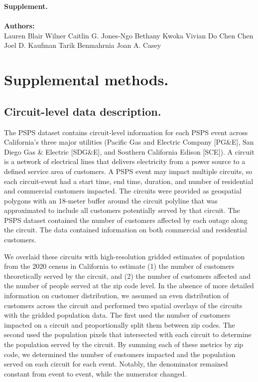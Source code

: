 \documentclass[../main.tex]{subfiles}
\begin{document}
% 

\textbf{Supplement.}
\\
\\
\textbf{Authors:}
\\
Lauren Blair Wilner
Caitlin G. Jones-Ngo
Bethany Kwoka
Vivian Do
Chen Chen
Joel D. Kaufman
Tarik Benmahrnia
Joan A. Casey

\pagebreak
\section{Supplemental methods.}
\subsection{Circuit-level data description.}
The PSPS dataset contains circuit-level information for each PSPS event across California's three major utilities (Pacific Gas and Electric Company [PG\&E], San Diego Gas \& Electric [SDG\&E], and Southern California Edison [SCE]). A circuit is a network of electrical lines that delivers electricity from a power source to a defined service area of customers. A PSPS event may impact multiple circuits, so each circuit-event had a start time, end time, duration, and number of residential and commercial customers impacted. The circuits were provided as geospatial polygons with an 18-meter buffer around the circuit polyline that was approximated to include all customers potentially served by that circuit. The PSPS dataset contained the number of customers affected by each outage along the circuit. The data contained information on both commercial and residential customers. 

We overlaid these circuits with high-resolution gridded estimates of population from the 2020 census in California to estimate (1) the number of customers theoretically served by the circuit, and (2) the number of customers affected and the number of people served at the zip code level. In the absence of more detailed information on customer distribution, we assumed an even distribution of customers across the circuit and performed two spatial overlays of the circuits with the gridded population data. The first used the number of customers impacted on a circuit and proportionally split them between zip codes. The second used the population pixels that intersected with each circuit to determine the population served by the circuit. By summing each of these metrics by zip code, we determined the number of customers impacted and the population served on each circuit for each event. Notably, the denominator remained constant from event to event, while the numerator changed.
\end{document}
